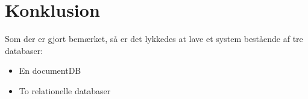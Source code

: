 
\section{Konklusion}

Som der er gjort bemærket, så er det lykkedes at lave et system bestående af tre databaser:


\begin{itemize}
    \item En documentDB
    \item To relationelle databaser 
\end{itemize}



